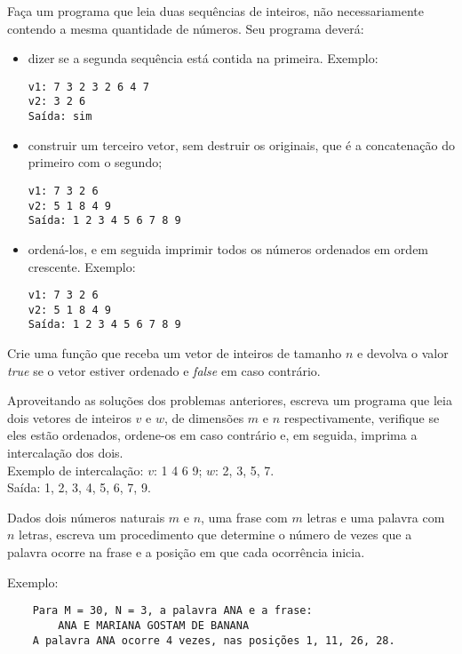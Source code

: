 \item Faça  um  programa  que   leia  duas  sequências  de  inteiros,  não
necessariamente  contendo a  mesma quantidade  de números. Seu programa
deverá:
\begin{itemize} 
\item dizer  se a segunda sequência está contida na primeira. Exemplo:
\begin{verbatim}
v1: 7 3 2 3 2 6 4 7 
v2: 3 2 6
Saída: sim
\end{verbatim}
\item construir um terceiro  vetor, sem  destruir os  originais, que é  
      a concatenação  do primeiro com o segundo;
\begin{verbatim}
v1: 7 3 2 6
v2: 5 1 8 4 9
Saída: 1 2 3 4 5 6 7 8 9
\end{verbatim}
\item ordená-los, e em seguida imprimir todos os números ordenados 
      em ordem crescente. Exemplo:
\begin{verbatim}
v1: 7 3 2 6
v2: 5 1 8 4 9
Saída: 1 2 3 4 5 6 7 8 9
\end{verbatim}
\end{itemize}

\item Crie uma função que receba um vetor de inteiros de 
     tamanho $n$ e devolva o valor \emph{true} se o vetor estiver ordenado e 
     \emph{false} em caso contrário.

\item Aproveitando as soluções dos problemas anteriores, escreva um programa
     que leia dois vetores de inteiros $v$ e $w$, 
     de dimensões $m$ e $n$ 
     respectivamente, verifique se eles estão ordenados, ordene-os em caso 
     contrário e, em seguida, imprima a intercalação dos dois. \\
     Exemplo de intercalação: $v$: 1 4 6 9; $w$: 2, 3, 5, 7. \\
     Saída: 1, 2, 3, 4, 5, 6, 7, 9. 

\item Dados dois números naturais $m$ e $n$, uma frase com $m$ letras
e uma palavra com $n$ letras, escreva um procedimento que determine o número de
vezes que a palavra ocorre na frase e a posição em que cada ocorrência inicia.

    Exemplo:
    \begin{verbatim}
    Para M = 30, N = 3, a palavra ANA e a frase:
        ANA E MARIANA GOSTAM DE BANANA
    A palavra ANA ocorre 4 vezes, nas posições 1, 11, 26, 28.
    \end{verbatim}

